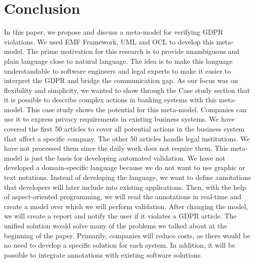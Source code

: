 \documentclass[11pt,english]{article}
\begin{document}
\section{Conclusion}
In this paper, we propose and discuss a meta-model for verifying GDPR violations. We used EMF Framework, UML and OCL to develop this meta-model. The prime motivation for this research is to provide unambiguous and plain language close to natural language. The idea is to make this language understandable to software engineers and legal experts to make it easier to interpret the GDPR and bridge the communication gap. \newline As our focus was on flexibility and simplicity, we wanted to show through the Case study section that it is possible to describe complex actions in banking systems with this meta-model. This case study shows the potential for this meta-model. Companies can use it to express privacy requirements in existing business systems. We have covered the first 50 articles to cover all potential actions in the business system that affect a specific company. The other 50 articles handle legal institutions. We have not processed them since the daily work does not require them. \newline This meta-model is just the basis for developing automated validation. We have not developed a domain-specific language because we do not want to use graphic or text notations. Instead of developing the language, we want to define annotations that developers will later include into existing applications. Then, with the help of aspect-oriented programming, we will read the annotations in real-time and create a model over which we will perform validation. After changing the model, we will create a report and notify the user if it violates a GDPR article. The unified solution would solve many of the problems we talked about at the beginning of the paper. Primarily, companies will reduce costs, as there would be no need to develop a specific solution for each system. In addition, it will be possible to integrate annotations with existing software solutions.
\printbibliography
\end{document}
